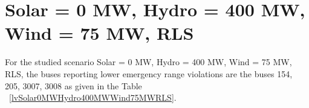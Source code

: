 \documentclass[10pt]{report}
\begin{document}
\section{Solar = 0 MW, Hydro = 400 MW, Wind = 75 MW, RLS}
For the studied scenario Solar = 0 MW, Hydro = 400 MW, Wind = 75 MW, RLS, the buses reporting lower emergency range violations are the buses 154, 205, 3007, 3008 as given in the Table ~\ref{lvSolar0MWHydro400MWWind75MWRLS}.
\begin{table}[H]
\caption{Contingencies reporting bus voltages lower than emergency voltage of 1.1 PU for scenario Solar = 0 MW, Hydro = 400 MW, Wind = 75 MW, RLS}
\label{lvSolar0MWHydro400MWWind75MWRLS}
\centering
{}
\end{table}
\end{document}
